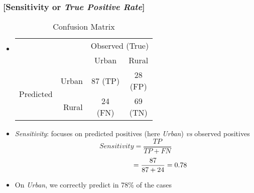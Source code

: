 \documentclass[xcolor=x11names,compress, aspectratio=169]{beamer}
\renewcommand{\(}{\begin{columns}}
\renewcommand{\)}{\end{columns}}
\newcommand{\<}[1]{\begin{column}{#1}}
\renewcommand{\>}{\end{column}}
\begin{document}
\begin{frame} %
\frametitle{\textcolor{brique}{[Sensitivity or \textit{True Positive Rate}]}}
\begin{itemize}[<+->]
  \item[]
    \begin{table}[]
    \begin{tabular}{l r|c|c|}

                              & & \multicolumn{2}{c|}{Observed (True)}                                                                                          \\
                              & &    Urban  &  Rural  \\  \hline
    \multirow{2}{*}{Predicted}& Urban & \shortstack[c]{$87$ \\ \tiny{(TP)}}& \shortstack[c]{28 \\ \tiny{(FP)}} \\ \cline{2-4}
                              & Rural &  \shortstack[c]{24 \\ \tiny{(FN)}}& \shortstack[c]{69 \\ \tiny{(TN)}} \\ \hline
    \end{tabular}
    \caption{Confusion Matrix}
    \end{table}
  \item \textit{Sensitivity}:  focuses on predicted positives (here \textit{Urban}) \textit{vs} observed positives
   $$ Sensitivity = \frac{TP}{TP + FN} $$
   $$
          \hspace{2.5cm}=  \frac{87}{87+24} = 0.78
 $$
  \item On \textit{Urban}, we correctly predict  in 78\% of the cases
\end{itemize}
\end{frame}
\end{document}

